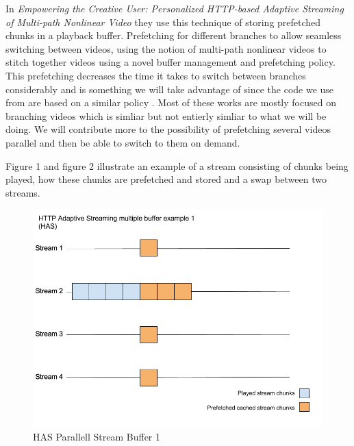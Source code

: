 \documentclass[9pt,a4paper]{acmproc}
\begin{document}
In \textit{Empowering the Creative User: Personalized HTTP-based Adaptive Streaming of Multi-path Nonlinear Video} they use this technique of storing prefetched chunks in a playback buffer. Prefetching for different branches to allow seamless switching between videos, using the notion of multi-path nonlinear videos to stitch together videos using a novel buffer management and prefetching policy. This prefetching decreases the time it takes to switch between branches considerably and is something we will take advantage of since the code we use from \cite[p.~317-326]{qualbranch} are based on a similar policy \cite[p.~591-596]{hasmultipath}. Most of these works are mostly focused on branching videos which is simliar but not entierly simliar to what we will be doing. We will contribute more to the possibility of prefetching several videos parallel and then be able to switch to them on demand. \cite[p.~317-326]{qualbranch} \cite[p.~591-596]{hasmultipath}

Figure 1 and figure 2 illustrate an example of a stream consisting of chunks being played, how these chunks are prefetched and stored and a swap between two streams.

\begin{figure}[!ht]
\begin{center}
\includegraphics[scale=0.3]{HAS1.png}
\caption{HAS Parallell Stream Buffer 1}
\end{center}
\end{figure}
\end{document}
